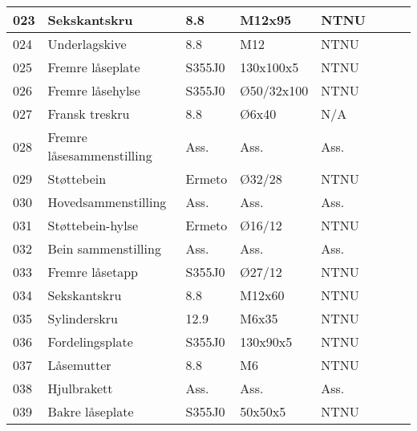 \begin{tabular}{|l|l|l|l|l|l|l|l|}
	023 & Sekskantskru & 8.8 & M12x95 & NTNU &  \\ \hline
	024 & Underlagskive & 8.8 & M12 & NTNU &  \\ \hline
	025 & Fremre låseplate & S355J0 & 130x100x5 & NTNU &  \\ \hline
	026 & Fremre låsehylse & S355J0 & Ø50/32x100 & NTNU &  \\ \hline
	027 & Fransk treskru & 8.8 & Ø6x40 & N/A &  \\ \hline
	028 & Fremre låsesammenstilling & Ass. & Ass. & Ass. &  \\ \hline
	029 & Støttebein & Ermeto & Ø32/28 & NTNU &  \\ \hline
	030 & Hovedsammenstilling & Ass. & Ass. & Ass. &  \\ \hline
	031 & Støttebein-hylse & Ermeto & Ø16/12 & NTNU &  \\ \hline
	032 & Bein sammenstilling & Ass. & Ass. & Ass. &  \\ \hline
	033 & Fremre låsetapp & S355J0 & Ø27/12 & NTNU &  \\ \hline
	034 & Sekskantskru & 8.8 & M12x60 & NTNU &  \\ \hline
	035 & Sylinderskru & 12.9 & M6x35 & NTNU &  \\ \hline
	036 & Fordelingsplate & S355J0 & 130x90x5 & NTNU &  \\ \hline
	037 & Låsemutter & 8.8 & M6 & NTNU &  \\ \hline
	038 & Hjulbrakett & Ass. & Ass. & Ass. &  \\ \hline
	039 & Bakre låseplate & S355J0 & 50x50x5 & NTNU &  \\ \hline
\end{tabular}
